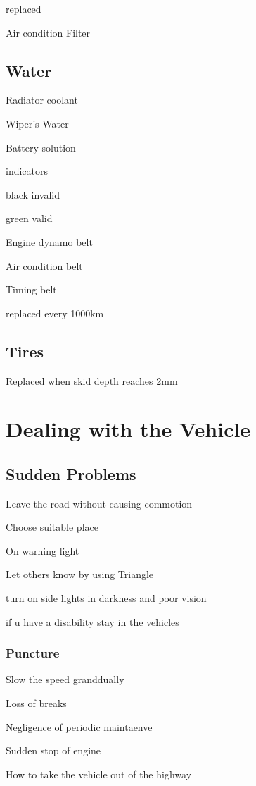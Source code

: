 \documentclass[openany]{book}
\begin{document}
replaced

Air condition Filter

\section{Water}

Radiator coolant

Wiper's Water

Battery solution

indicators

black invalid

green valid


Engine dynamo belt

Air condition belt

Timing belt

replaced every 1000km

\section{Tires}

Replaced when skid depth reaches 2mm

\chapter{Dealing with the Vehicle}

\section{Sudden Problems}

Leave the road without causing commotion

Choose suitable place

On warning light

Let others know by using Triangle

turn on side lights in darkness and poor vision

if u have a disability stay in the vehicles


\subsection{Puncture}

Slow the speed granddually

Loss of breaks

Negligence of periodic maintaenve


Sudden stop of engine

How to take the vehicle out of the highway
\end{document}
